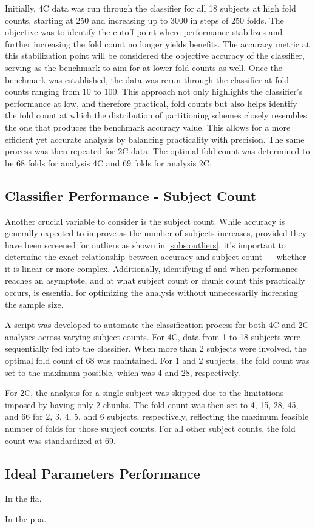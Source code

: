 Initially, \gls{4C} data was run through the classifier for all 18 subjects at high fold counts, starting at 250 and increasing up to 3000 in steps of 250 folds. The objective was to identify the cutoff point where performance stabilizes and further increasing the fold count no longer yields benefits. The accuracy metric at this stabilization point will be considered the objective accuracy of the classifier, serving as the benchmark to aim for at lower fold counts as well. Once the benchmark was established, the data was rerun through the classifier at fold counts ranging from 10 to 100. This approach not only highlights the classifier's performance at low, and therefore practical, fold counts but also helps identify the fold count at which the distribution of partitioning schemes closely resembles the one that produces the benchmark accuracy value. This allows for a more efficient yet accurate analysis by balancing practicality with precision. The same process was then repeated for \gls{2C} data. The optimal fold count was determined to be 68 folds for analysis \gls{4C} and 69 folds for analysis \gls{2C}. 

\subsection{Classifier Performance - Subject Count}

Another crucial variable to consider is the subject count. While accuracy is generally expected to improve as the number of subjects increases, provided they have been screened for outliers as shown in \autoref{subs:outliers}, it's important to determine the exact relationship between accuracy and subject count --- whether it is linear or more complex. Additionally, identifying if and when performance reaches an asymptote, and at what subject count or chunk count this practically occurs, is essential for optimizing the analysis without unnecessarily increasing the sample size.

A script was developed to automate the classification process for both \gls{4C} and \gls{2C} analyses across varying subject counts. For \gls{4C}, data from 1 to 18 subjects were sequentially fed into the classifier. When more than 2 subjects were involved, the optimal fold count of 68 was maintained. For 1 and 2 subjects, the fold count was set to the maximum possible, which was 4 and 28, respectively.

For \gls{2C}, the analysis for a single subject was skipped due to the limitations imposed by having only 2 chunks. The fold count was then set to 4, 15, 28, 45, and 66 for 2, 3, 4, 5, and 6 subjects, respectively, reflecting the maximum feasible number of folds for those subject counts. For all other subject counts, the fold count was standardized at 69.

\subsection{Ideal Parameters Performance}

In the ffa.

In the ppa.